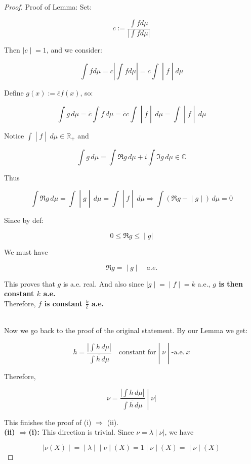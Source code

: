 \begin{proof}
Proof of Lemma: Set:

\[c := \frac{\int fd\mu}{\left| {\int fd\mu} \right|}\]

Then \(\left. |c \middle| = 1 \right.\), and we consider:

\[\left. \int fd\mu = c\left| {\int fd\mu} \right| = c\int \middle| f \middle| d\mu \right.\]

Define \(g(x) := \bar{c}f(x)\), so:

\[\left. \int g\, d\mu = \bar{c}\int f\, d\mu = \bar{c}c\int \middle| f \middle| \, d\mu = \int \middle| f \middle| \, d\mu \right.\]

Notice \(\left. \int \middle| f \middle| \, d\mu \in \mathbb{R}_{+} \right.\) and

\[\int g\, d\mu = \int\Re g\, d\mu + i\int\Im g\, d\mu \in \mathbb{C}\]

Thus

\[\left. \int\Re g\, d\mu = \int \middle| g \middle| \, d\mu = \int \middle| f \middle| \, d\mu\Longrightarrow\int(\Re g - \middle| g \middle| )\, d\mu = 0 \right.\]

Since by def:

\[\left. 0 \leq \Re g \leq \middle| g| \right.\]

We must have

\[\left. \Re g = \middle| g \middle| \quad a.e. \right.\]

This proves that \(g\) is a.e. real. And also since \(\left. |g \middle| = \middle| f \middle| = k \right.\) a.e., \textbf{\(g\) is then constant \(k\) a.e.}\\
Therefore, \textbf{\(f\) is constant \(\frac{k}{\bar{c}}\) a.e.}\\
\strut \\
Now we go back to the proof of the original statement. By our Lemma we get:

\[\left. h = \frac{\left| {\int h\, d\mu} \right|}{\bar{\int h\, d\mu}}\quad\text{constant for} \middle| \nu \middle| \text{-a.e.}\ x \right.\]

Therefore,

\[\left. \nu = \frac{\left| {\int h\, d\mu} \right|}{\bar{\int h\, d\mu}} \middle| \nu| \right.\]

This finishes the proof of (i) \(\Longrightarrow\) (ii).\\
\textbf{(ii) \(\Longrightarrow\)(i):} This direction is trivial. Since \(\left. \nu = \lambda \middle| \nu| \right.\), we have

\[\left. |\nu(X) \middle| = \middle| \lambda \middle| \middle| \nu \middle| (X) = 1 \middle| \nu \middle| (X) = \middle| \nu \middle| (X) \right.\]

\end{proof}

